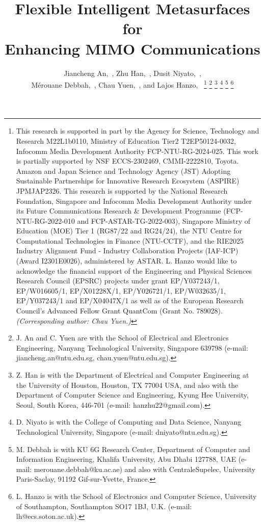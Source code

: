 \documentclass[lettersize,journal]{IEEEtran}
\begin{document}
\title{Flexible Intelligent Metasurfaces for\\Enhancing MIMO Communications}
\author{Jiancheng An,~, Zhu Han,~, Dusit Niyato,~,\\M\'erouane Debbah,~, Chau Yuen,~, and Lajos Hanzo,~
\thanks{This research is supported in part by the Agency for Science, Technology and Research M22L1b0110, Ministry of Education Tier2 T2EP50124-0032, Infocomm Media Development Authority FCP-NTU-RG-2024-025. This work is partially supported by NSF ECCS-2302469, CMMI-2222810, Toyota. Amazon and Japan Science and Technology Agency (JST) Adopting Sustainable Partnerships for Innovative Research Ecosystem (ASPIRE) JPMJAP2326. This research is supported by the National Research Foundation, Singapore and Infocomm Media Development Authority under its Future Communications Research \& Development Programme (FCP-NTU-RG-2022-010 and FCP-ASTAR-TG-2022-003), Singapore Ministry of Education (MOE) Tier 1 (RG87/22 and RG24/24), the NTU Centre for Computational Technologies in Finance (NTU-CCTF), and the RIE2025 Industry Alignment Fund - Industry Collaboration Projects (IAF-ICP) (Award I2301E0026), administered by A\*STAR. L. Hanzo would like to acknowledge the financial support of the Engineering and Physical Sciences Research Council (EPSRC) projects under grant EP/Y037243/1, EP/W016605/1, EP/X01228X/1, EP/Y026721/1, EP/W032635/1, EP/Y037243/1 and EP/X04047X/1 as well as of the European Research Council's Advanced Fellow Grant QuantCom (Grant No. 789028). \emph{(Corresponding author: Chau Yuen.)}}
\thanks{J. An and C. Yuen are with the School of Electrical and Electronics Engineering, Nanyang Technological University, Singapore 639798 (e-mail: jiancheng.an@ntu.edu.sg, chau.yuen@ntu.edu.sg).}
\thanks{Z. Han is with the Department of Electrical and Computer Engineering at the University of Houston, Houston, TX 77004 USA, and also with the Department of Computer Science and Engineering, Kyung Hee University, Seoul, South Korea, 446-701 (e-mail: hanzhu22@gmail.com).}
\thanks{D. Niyato is with the College of Computing and Data Science, Nanyang Technological University, Singapore (e-mail: dniyato@ntu.edu.sg).}
\thanks{M. Debbah is with KU 6G Research Center, Department of Computer and Information Engineering, Khalifa University, Abu Dhabi 127788, UAE (e-mail: merouane.debbah@ku.ac.ae) and also with CentraleSupelec, University Paris-Saclay, 91192 Gif-sur-Yvette, France.}
\thanks{L. Hanzo is with the School of Electronics and Computer Science, University of Southampton, Southampton SO17 1BJ, U.K. (e-mail: lh@ecs.soton.ac.uk).}\vspace{-1cm}}
\end{document}
